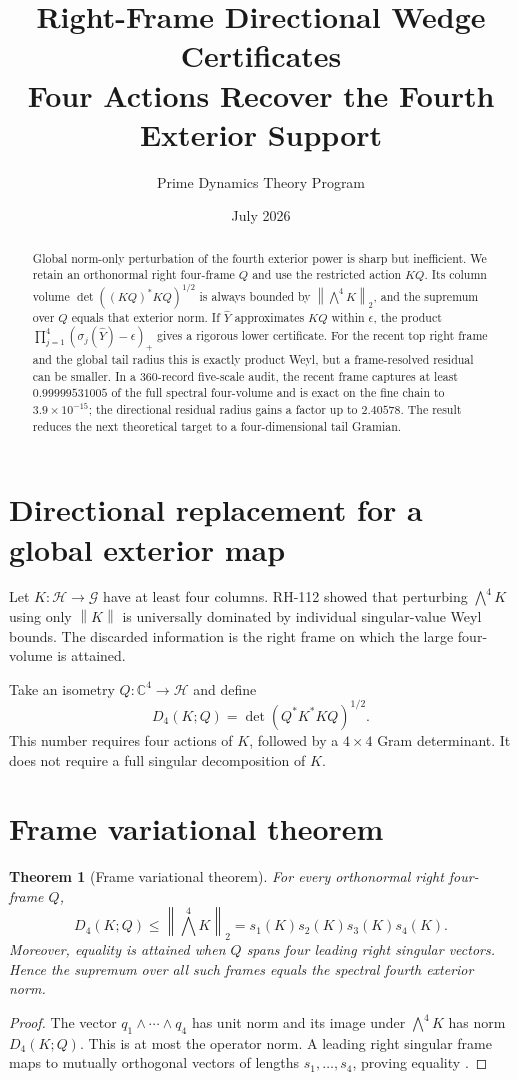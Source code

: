 \documentclass[12pt]{article}
\title{Right-Frame Directional Wedge Certificates\\\large Four Actions Recover the Fourth Exterior Support}
\author{Prime Dynamics Theory Program}\date{July 2026}
\newtheorem{theorem}{Theorem}\newtheorem{proposition}[theorem]{Proposition}\newtheorem{corollary}[theorem]{Corollary}\newtheorem{remark}[theorem]{Remark}
\newcommand{\norm}[1]{\left\lVert#1\right\rVert}
\begin{document}
\maketitle
\begin{abstract}
Global norm-only perturbation of the fourth exterior power is sharp but
inefficient.  We retain an orthonormal right four-frame $Q$ and use the
restricted action $KQ$.  Its column volume
$\det((KQ)^*KQ)^{1/2}$ is always bounded by
$\norm{\bigwedge^4K}_2$, and the supremum over $Q$ equals that exterior norm.
If $\widehat Y$ approximates $KQ$ within $\epsilon$, the product
$\prod_{j=1}^4(\sigma_j(\widehat Y)-\epsilon)_+$ gives a rigorous lower
certificate.  For the recent top right frame and the global tail radius this
is exactly product Weyl, but a frame-resolved residual can be smaller.  In a
360-record five-scale audit, the recent frame captures at least
$0.99999531005$ of the full spectral four-volume and is exact on the fine
chain to $3.9\times10^{-15}$; the directional residual radius gains a factor
up to $2.40578$.  The result reduces the next theoretical target to a
four-dimensional tail Gramian.
\end{abstract}

\section{Directional replacement for a global exterior map}
Let $K:\mathcal H\to\mathcal G$ have at least four columns.  RH-112 showed
that perturbing $\bigwedge^4K$ using only $\norm K$ is universally dominated
by individual singular-value Weyl bounds.  The discarded information is the
right frame on which the large four-volume is attained.

Take an isometry $Q:\mathbb C^4\to\mathcal H$ and define
\[
 D_4(K;Q)=\det(Q^*K^*KQ)^{1/2}.
\]
This number requires four actions of $K$, followed by a $4\times4$ Gram
determinant.  It does not require a full singular decomposition of $K$.

\section{Frame variational theorem}
\begin{theorem}[Frame variational theorem]\label{thm:frame}
For every orthonormal right four-frame $Q$,
\[
 D_4(K;Q)\leq\norm{\bigwedge^4K}_2
 =s_1(K)s_2(K)s_3(K)s_4(K).
\]
Moreover, equality is attained when $Q$ spans four leading right singular
vectors.  Hence the supremum over all such frames equals the spectral fourth
exterior norm.
\end{theorem}
\begin{proof}
The vector $q_1\wedge\cdots\wedge q_4$ has unit norm and its image under
$\bigwedge^4K$ has norm $D_4(K;Q)$.  This is at most the operator norm.  A
leading right singular frame maps to mutually orthogonal vectors of lengths
$s_1,\ldots,s_4$, proving equality \citep{HornJohnson1991}.
\end{proof}
\end{document}
